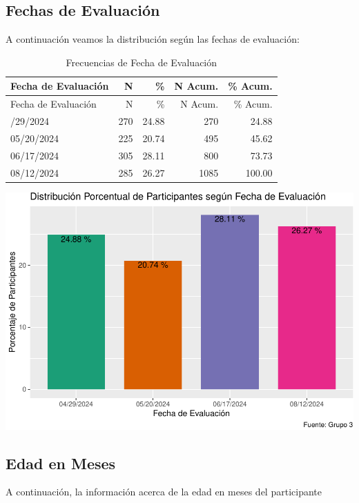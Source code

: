 \documentclass[
]{article}
\begin{document}
\subsection{Fechas de Evaluación}\label{fechas-de-evaluaciuxf3n}

A continuación veamos la distribución según las fechas de evaluación:

\begin{longtable}[]{@{}lrrrr@{}}
\caption{Frecuencias de Fecha de Evaluación}\tabularnewline
\toprule\noalign{}
Fecha de Evaluación & N & \% & N Acum. & \% Acum. \\
\midrule\noalign{}
\endfirsthead
\toprule\noalign{}
Fecha de Evaluación & N & \% & N Acum. & \% Acum. \\
\midrule\noalign{}
\endhead
\bottomrule\noalign{}
\endlastfoot
04/29/2024 & 270 & 24.88 & 270 & 24.88 \\
05/20/2024 & 225 & 20.74 & 495 & 45.62 \\
06/17/2024 & 305 & 28.11 & 800 & 73.73 \\
08/12/2024 & 285 & 26.27 & 1085 & 100.00 \\
\end{longtable}

\includegraphics{Info_Dinix_02_files/figure-latex/30_Dem_FechAp-1.pdf}

\subsection{Edad en Meses}\label{edad-en-meses}

A continuación, la información acerca de la edad en meses del
participante
\end{document}
